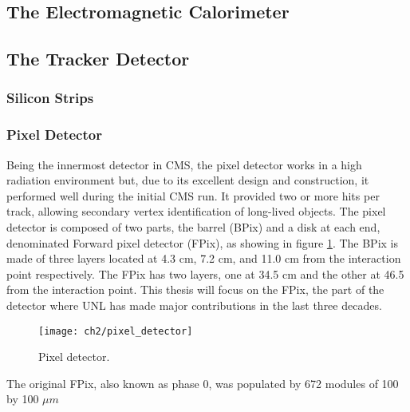 \subsection{The Electromagnetic Calorimeter}

\subsection{The Tracker Detector}


\subsubsection{Silicon Strips}


\subsubsection{Pixel Detector}
Being the innermost detector in CMS, the pixel detector works in a high radiation environment but, due to its excellent design and construction, it performed well during the initial CMS run. It provided two or more hits per track, allowing secondary vertex identification of long-lived objects. The pixel detector is composed of two parts, the barrel (BPix) and a disk at each end, denominated Forward pixel detector (FPix), as showing in figure \ref{pixeldetector}. The BPix is made of three layers located at 4.3 cm, 7.2 cm, and 11.0 cm from the interaction point respectively. The FPix has two layers, one at 34.5 cm and the other at 46.5 from the interaction point. This thesis will focus on the FPix, the part of the detector where UNL has made major contributions in the last {} three decades.  

\begin{figure}[!h]
	\centering
	\texttt{[image: ch2/pixel\_detector]}
	\caption[Pixel detector]{Pixel detector.}
	\label{pixeldetector}
\end{figure}

  

The original FPix, also known as phase 0, was populated by 672 modules of 100 by 100 $\mu m$ 





